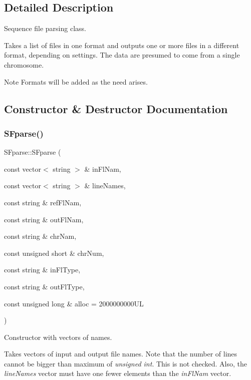 \subsection{Detailed Description}
Sequence file parsing class. 

Takes a list of files in one format and outputs one or more files in a different format, depending on settings. The data are presumed to come from a single chromosome.

\begin{DoxyNote}{Note}
Formats will be added as the need arises. 
\end{DoxyNote}


\subsection{Constructor \& Destructor Documentation}
\mbox{\label{class_s_fparse_a63162a0c3d8c855602796198854eb36f}} 
\subsubsection{\texorpdfstring{S\+Fparse()}{SFparse()}\hspace{0.1cm}{\footnotesize\ttfamily [1/5]}}
{\footnotesize\ttfamily S\+Fparse\+::\+S\+Fparse (\begin{DoxyParamCaption}\item[{const vector$<$ string $>$ \&}]{in\+Fl\+Nam,  }\item[{const vector$<$ string $>$ \&}]{line\+Names,  }\item[{const string \&}]{ref\+Fl\+Nam,  }\item[{const string \&}]{out\+Fl\+Nam,  }\item[{const string \&}]{chr\+Nam,  }\item[{const unsigned short \&}]{chr\+Num,  }\item[{const string \&}]{in\+Fl\+Type,  }\item[{const string \&}]{out\+Fl\+Type,  }\item[{const unsigned long \&}]{alloc = {\ttfamily 2000000000UL} }\end{DoxyParamCaption})}



Constructor with vectors of names. 

Takes vectors of input and output file names. Note that the number of lines cannot be bigger than maximum of {\itshape unsigned int}. This is not checked. Also, the {\itshape line\+Names} vector must have one fewer elements than the {\itshape in\+Fl\+Nam} vector.


